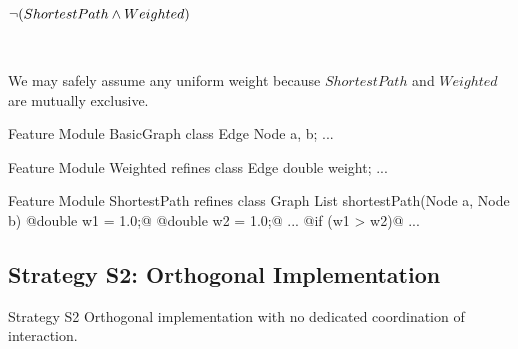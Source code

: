 \begin{frame}[fragile]{\myframetitle}
	\begin{fancycolumns}[animation=none]
		\centering

		$\neg (ShortestPath \wedge Weighted)$  

		~
		\begin{note}{}
			We may safely assume any uniform weight because $ShortestPath$ and $Weighted$ are mutually exclusive.
		\end{note}
	\nextcolumn
\begin{codetight}{Feature Module BasicGraph}
class Edge {
	Node a, b; ...
}
\end{codetight}	
\begin{codetight}{Feature Module Weighted}
refines class Edge {
	double weight; ...
}
\end{codetight}	
\begin{codetight}{Feature Module ShortestPath}
refines class Graph {
	List shortestPath(Node a, Node b){
		@double w1 = 1.0;@
		@double w2 = 1.0;@
		...
		@if (w1 > w2)@
		... 
	}
}
\end{codetight}	
	\end{fancycolumns}
\end{frame}

\subsection{Strategy S2: Orthogonal Implementation}

\begin{frame}{\myframetitle}
	\begin{fancycolumns}[widths={30},animation=none]
		\begin{definition}{Strategy S2}
			Orthogonal implementation with no dedicated coordination of interaction.
		\end{definition}
	\nextcolumn
	\end{fancycolumns}
\end{frame}

